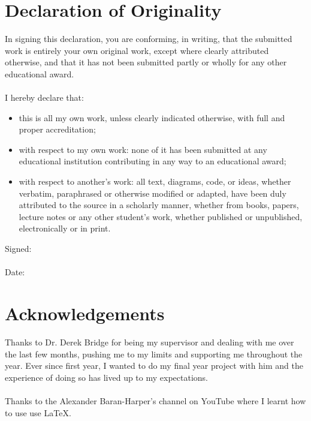 \documentclass[12pt]{article}
\begin{document}
\section*{Declaration of Originality}
In signing this declaration, you are conforming, in writing, that the submitted work is entirely your own original work, except where clearly attributed otherwise, and that it has not been submitted partly or wholly for any other educational award.
\\\\
I hereby declare that:
\begin{itemize}
  \item this is all my own work, unless clearly indicated otherwise, with full and proper accreditation;
  \item with respect to my own work: none of it has been submitted at any educational institution contributing in any way to an educational award;
  \item with respect to another’s work: all text, diagrams, code, or ideas, whether verbatim, paraphrased or otherwise modified or adapted, have been duly attributed to the source in a scholarly manner, whether from books, papers, lecture notes or any other student’s work, whether published or unpublished, electronically or in print.
\end{itemize}
\noindent Signed:\dotfill
\\\\
Date:\dotfill
\clearpage

\section*{Acknowledgements}
Thanks to Dr. Derek Bridge for being my supervisor and dealing with me over the last few months, pushing me to my limits and supporting me throughout the year. Ever since first year, I wanted to do my final year project with him and the experience of doing so has lived up to my expectations. 
\\\\
Thanks to the Alexander Baran-Harper's channel on YouTube where I learnt how to use use LaTeX.
\clearpage


\tableofcontents
\thispagestyle{empty}
\cleardoublepage
\end{document}
